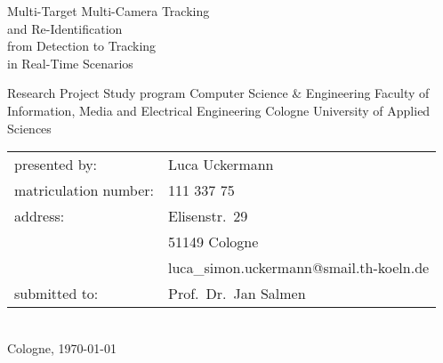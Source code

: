 \begin{titlepage}

    \begin{center}
    \end{center}

    \vspace*{10mm}

    \begin{huge}
        \noindent
        Multi-Target Multi-Camera Tracking\\and Re-Identification\\[5mm]from Detection to Tracking\\in Real-Time Scenarios\\[10mm]
    \end{huge}

    Research Project\newline
    Study program Computer Science \& Engineering\newline
    Faculty of Information, Media and Electrical Engineering\newline
    Cologne University of Applied Sciences\\[30mm]

    \begin{tabular}{@{}ll}
        presented by:         & Luca Uckermann                          \\
        matriculation number: & 111 337 75                              \\
        address:              & Elisenstr.~29                           \\
                              & 51149 Cologne                           \\
                              & luca\_simon.uckermann@smail.th-koeln.de \\[5mm]
        submitted to:         & Prof.~Dr.~Jan Salmen                    \\
    \end{tabular}
    \\[10mm]

    Cologne, \today

\end{titlepage}